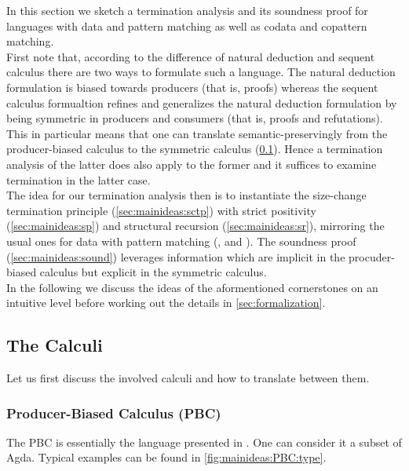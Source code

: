In this section we sketch a termination analysis and its soundness proof for languages with data and pattern matching as well as codata and copattern matching.
\\
First note that, according to the difference of natural deduction and sequent calculus there are two ways to formulate such a language.
The natural deduction formulation is biased towards producers (that is, proofs) whereas the sequent calculus formualtion refines and generalizes the natural deduction formulation by being symmetric in producers and consumers (that is, proofs and refutations).
This in particular means that one can translate semantic-preservingly from the producer-biased calculus to the symmetric calculus (\cref{sec:mainideas:calculi}).
Hence a termination analysis of the latter does also apply to the former and it suffices to examine termination in the latter case.
\\
The idea for our termination analysis then is to instantiate the size-change termination principle (\cref{sec:mainideas:sctp}) with strict positivity (\cref{sec:mainideas:sp}) and structural recursion (\cref{sec:mainideas:sr}), mirroring the usual ones for data with pattern matching (\cite{pauline-mohring}, \cite{foetus} and \cite{abel-altenkirch}).
The soundness proof (\cref{sec:mainideas:sound}) leverages information which are implicit in the procuder-biased calculus but explicit in the symmetric calculus.
\\
In the following we discuss the ideas of the aformentioned cornerstones on an intuitive level before working out the details in \cref{sec:formalization}.

\subsection{The Calculi}
\label{sec:mainideas:calculi}

Let us first discuss the involved calculi and how to translate between them.

\subsubsection{Producer-Biased Calculus (PBC)}

The PBC is essentially the language presented in \cite{uroboro}.
One can consider it a subset of Agda.
Typical examples can be found in \cref{fig:mainideas:PBC:type}.

